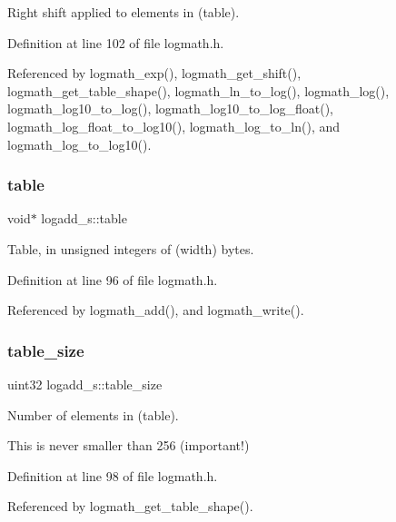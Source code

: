 Right shift applied to elements in (table). 



Definition at line 102 of file logmath.\+h.



Referenced by logmath\+\_\+exp(), logmath\+\_\+get\+\_\+shift(), logmath\+\_\+get\+\_\+table\+\_\+shape(), logmath\+\_\+ln\+\_\+to\+\_\+log(), logmath\+\_\+log(), logmath\+\_\+log10\+\_\+to\+\_\+log(), logmath\+\_\+log10\+\_\+to\+\_\+log\+\_\+float(), logmath\+\_\+log\+\_\+float\+\_\+to\+\_\+log10(), logmath\+\_\+log\+\_\+to\+\_\+ln(), and logmath\+\_\+log\+\_\+to\+\_\+log10().

\mbox{\label{structlogadd__s_a27793577d513d85cd73c2daffc140695}} 
\subsubsection{table}
{\footnotesize\ttfamily void$\ast$ logadd\+\_\+s\+::table}



Table, in unsigned integers of (width) bytes. 



Definition at line 96 of file logmath.\+h.



Referenced by logmath\+\_\+add(), and logmath\+\_\+write().

\mbox{\label{structlogadd__s_a484c53a05b46d863d0456af679cee5d8}} 
\subsubsection{table\+\_\+size}
{\footnotesize\ttfamily uint32 logadd\+\_\+s\+::table\+\_\+size}



Number of elements in (table). 

This is never smaller than 256 (important!) 

Definition at line 98 of file logmath.\+h.



Referenced by logmath\+\_\+get\+\_\+table\+\_\+shape().

\mbox{\label{structlogadd__s_a8e35a353d751d957270baf5192007c3e}} 
